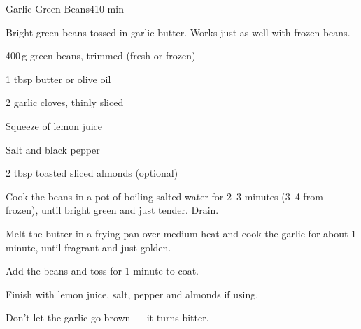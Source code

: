 \begin{recipebox}{Garlic Green Beans}{4}{10 min}

Bright green beans tossed in garlic butter. Works just as well with frozen
beans.

\begin{ingredients}
  \item 400\,g green beans, trimmed (fresh or frozen)
  \item 1 tbsp butter or olive oil
  \item 2 garlic cloves, thinly sliced
  \item Squeeze of lemon juice
  \item Salt and black pepper
  \item 2 tbsp toasted sliced almonds (optional)
\end{ingredients}

\begin{method}
  \item Cook the beans in a pot of boiling salted water for 2--3 minutes (3--4 from frozen), until bright green and just tender. Drain.
  \item Melt the butter in a frying pan over medium heat and cook the garlic for about 1 minute, until fragrant and just golden.
  \item Add the beans and toss for 1 minute to coat.
  \item Finish with lemon juice, salt, pepper and almonds if using.
\end{method}

\begin{notelist}
  \item Don't let the garlic go brown --- it turns bitter.
\end{notelist}

\end{recipebox}
